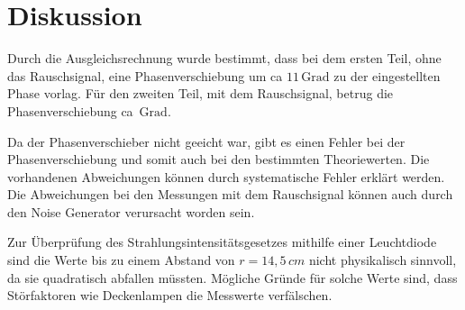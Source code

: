 \section{Diskussion}
Durch die Ausgleichsrechnung wurde bestimmt, dass bei dem ersten Teil, ohne das Rauschsignal,
eine Phasenverschiebung um ca $11 \, \text{Grad}$ zu der eingestellten Phase vorlag.
Für den zweiten Teil, mit dem Rauschsignal, betrug die Phasenverschiebung ca $ \, \text{Grad}$.

Da der Phasenverschieber nicht geeicht war, gibt es einen Fehler bei der Phasenverschiebung
und somit auch bei den bestimmten Theoriewerten. Die vorhandenen Abweichungen können durch systematische Fehler
erklärt werden. Die Abweichungen bei den Messungen mit dem Rauschsignal können auch durch den Noise Generator
verursacht worden sein.

Zur Überprüfung des Strahlungsintensitätsgesetzes mithilfe einer Leuchtdiode sind die Werte bis zu einem
Abstand von $r = 14,5 \, cm$ nicht physikalisch sinnvoll, da sie quadratisch abfallen müssten.
Mögliche Gründe für solche Werte sind, dass Störfaktoren wie Deckenlampen die
Messwerte verfälschen.
